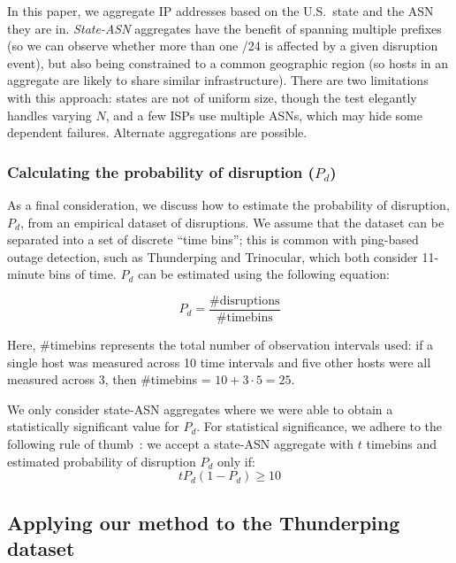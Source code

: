 In this paper, we aggregate IP addresses based on the U.S.~state and
the ASN they are in.
%
\emph{State-ASN} aggregates have the benefit of spanning
multiple prefixes (so we can observe whether more than one
/24 is affected by a given disruption event), but also being
constrained to a common geographic region (so hosts in an
aggregate are likely to share similar infrastructure).
There are two limitations with this approach: states are not
of uniform size, though the test elegantly handles
varying $N$, and a few ISPs use multiple ASNs, which may
hide some dependent failures.  Alternate aggregations are
possible.


\subsubsection{Calculating the probability of disruption ($P_d$)} 
\label{sec:calc_fprob}

As a final consideration, we discuss how to estimate the probability of
disruption, $P_d$, from an empirical dataset of disruptions.
%
We assume that the dataset can be separated into a set of discrete
``time bins''; this is common with ping-based outage detection, such as
Thunderping and Trinocular, which both consider 11-minute bins of time.
%
$P_d$ can be estimated using the following equation:

\begin{equation}
	P_d = \frac{\mbox{\#disruptions}}{\mbox{\#timebins}}
\label{eq:p_dropout}
\end{equation}


\noindent
%
Here, \#timebins represents the total number of observation intervals
used: if a single host was measured across 10 time intervals and five
other hosts were all measured across 3, then \#timebins = $10 + 3 \cdot
5 = 25$.



We only consider state-ASN aggregates where we were able to obtain a
statistically significant value for $P_d$. For statistical
significance, we adhere to the following rule of
thumb~\cite[Chapter~6]{biostats-book}: we accept a state-ASN aggregate
with $t$ timebins and estimated probability of disruption $P_d$ only if:
\begin{equation}
	tP_d(1-P_d) \geq 10
	\label{eq:stat_sig}
\end{equation}


\subsection{Applying our method to the Thunderping dataset}

